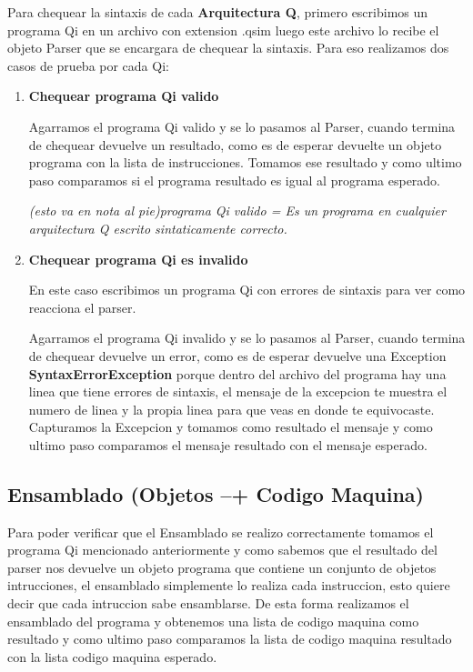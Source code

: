 Para chequear la sintaxis de cada \textbf{Arquitectura Q}, primero escribimos un programa Qi en un archivo con extension .qsim luego este archivo lo recibe el objeto Parser que se encargara de chequear la sintaxis. 
Para eso realizamos dos casos de prueba por cada Qi:
\begin{enumerate}
\item \textbf{Chequear programa Qi valido}

Agarramos el programa Qi valido y se lo pasamos al Parser, cuando termina de chequear devuelve un resultado, como es de esperar devuelte un objeto programa con la lista de instrucciones. Tomamos ese resultado y como ultimo paso comparamos si el programa resultado es igual al programa esperado.

\textit{ (esto va en nota al pie)programa Qi valido = Es un programa en cualquier arquitectura Q escrito sintaticamente correcto.}

\item \textbf{Chequear programa Qi es invalido} 

En este caso escribimos un programa Qi con errores de sintaxis para ver como reacciona el parser.

Agarramos el programa Qi invalido y se lo pasamos al Parser, cuando termina de chequear devuelve un error, como es de esperar devuelve una Exception \textbf{SyntaxErrorException} porque dentro del archivo del programa hay una linea que tiene errores de sintaxis, el mensaje de la excepcion te muestra el numero de linea y la propia linea para que veas en donde te equivocaste. Capturamos la Excepcion y tomamos como resultado el mensaje y como ultimo paso comparamos el mensaje resultado con el mensaje esperado.
\end{enumerate}

\subsection{Ensamblado (Objetos --+ Codigo Maquina)}

Para poder verificar que el Ensamblado se realizo correctamente tomamos el programa Qi mencionado anteriormente y como sabemos que el resultado del parser nos devuelve un objeto programa que contiene un conjunto de objetos intrucciones, el ensamblado simplemente lo realiza cada instruccion, esto quiere decir que cada intruccion sabe ensamblarse. De esta forma realizamos el ensamblado del programa y obtenemos una lista de codigo maquina como resultado y como ultimo paso comparamos la lista de codigo maquina resultado con la lista codigo maquina esperado.

